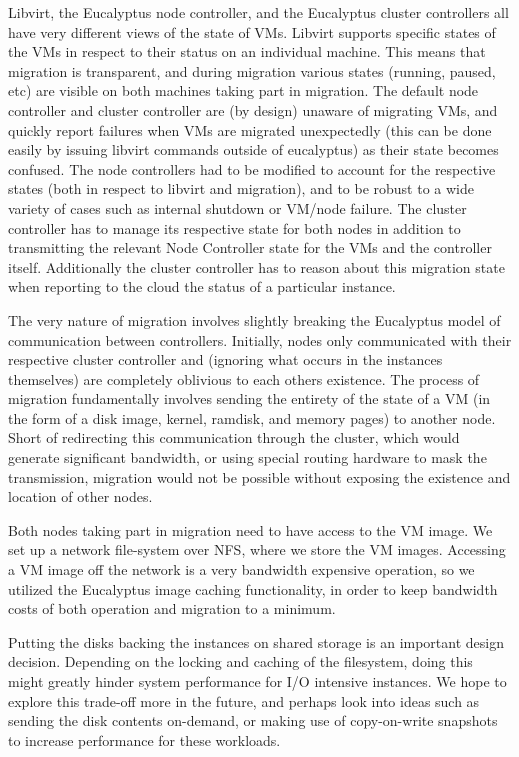 Libvirt, the Eucalyptus node controller, and the Eucalyptus cluster controllers
all have very different views of the state of VMs.  Libvirt supports specific
states of the VMs in respect to their status on an individual machine. This
means that migration is transparent, and during migration various states
(running, paused, etc) are visible on both machines taking part in migration.
The default node controller and cluster controller are (by design) unaware of
migrating VMs, and quickly report failures when VMs are migrated unexpectedly
(this can be done easily by issuing libvirt commands outside of eucalyptus) as
their state becomes confused.  The node controllers had to be modified to
account for the respective states (both in respect to libvirt and migration),
and to be robust to a wide variety of cases such as internal shutdown or VM/node
failure.  The cluster controller has to manage its respective state for both
nodes in addition to transmitting the relevant Node Controller state for the VMs
and the controller itself.  Additionally the cluster controller has to reason
about this migration state when reporting to the cloud the status of a
particular instance.

The very nature of migration involves slightly breaking the Eucalyptus model of
communication between controllers.  Initially, nodes only communicated with
their respective cluster controller and (ignoring what occurs in the instances
themselves) are completely oblivious to each others existence.  The process of
migration fundamentally involves sending the entirety of the state of a VM (in
the form of a disk image, kernel, ramdisk, and memory pages) to another node.
Short of redirecting this communication through the cluster, which would
generate significant bandwidth, or using special routing hardware to mask the
transmission, migration would not be possible without exposing the existence and
location of other nodes.

Both nodes taking part in migration need to have access to the VM image.  We set
up a network file-system over NFS, where we store the VM images.  Accessing a VM
image off the network is a very bandwidth expensive operation, so we utilized
the Eucalyptus image caching functionality, in order to keep bandwidth costs of
both operation and migration to a minimum.

Putting the disks backing the instances on shared storage is an important design
decision.  Depending on the locking and caching of the filesystem, doing this
might greatly hinder system performance for I/O intensive instances.  We hope to
explore this trade-off more in the future, and perhaps look into ideas such as
sending the disk contents on-demand, or making use of copy-on-write snapshots to
increase performance for these workloads.

